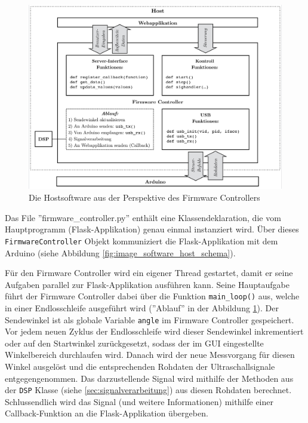 \begin{figure}[htb]
\begin{center}
\includegraphics[width=\textwidth]{graphics/image_software_firmware_controller.png}
\end{center}
\caption{Die Hostsoftware aus der Perspektive des Firmware Controllers} %
\label{fig:image_software_firmware_controller}
\end{figure}
%

Das File ''firmware\_controller.py'' enthält eine Klassendeklaration, die vom Hauptprogramm (Flask-Applikation) genau einmal instanziert wird. Über dieses \texttt{FirmwareController} Objekt kommuniziert die Flask-Applikation mit dem Arduino (siehe Abbildung \ref{fig:image_software_host_schema}).

Für den Firmware Controller wird ein eigener Thread gestartet, damit er seine Aufgaben parallel zur Flask-Applikation ausführen kann. Seine Hauptaufgabe führt der Firmware Controller dabei über die Funktion \texttt{main\_loop()} aus, welche in einer Endlosschleife ausgeführt wird (''Ablauf'' in der Abbildung \ref{fig:image_software_firmware_controller}).
Der Sendewinkel ist als globale Variable \texttt{angle} im Firmware Controller gespeichert. Vor jedem neuen Zyklus der Endlosschleife wird dieser Sendewinkel inkrementiert oder auf den Startwinkel zurückgesetzt, sodass der im GUI eingestellte Winkelbereich durchlaufen wird. Danach wird der neue Messvorgang für diesen Winkel ausgelöst und die entsprechenden Rohdaten der Ultraschallsignale entgegengenommen. Das darzustellende Signal wird mithilfe der Methoden aus der \texttt{DSP} Klasse (siehe \ref{sec:signalverarbeitung}) aus diesen Rohdaten berechnet. Schlussendlich wird das Signal (und weitere Informationen) mithilfe einer Callback-Funktion an die Flask-Applikation übergeben.

